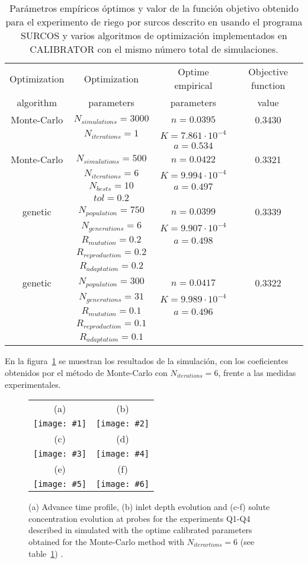 \documentclass[review,authoryear]{elsarticle}
\newcommand{\TABLE}[5]
{
	\begin{table}[ht!]
		\centering
		\caption{#4.\label{#5}}
		#1
		\begin{tabular}{#2}
			#3
		\end{tabular}
	\end{table}
}
\newcommand{\FIGVI}[8]
{
	\begin{figure}[ht!]
		\centering
		\begin{tabular}{cc}
			(a) & (b)
			\\ \texttt{[image: \#1]} & \texttt{[image: \#2]}
			\\ (c) & (d)
			\\ \texttt{[image: \#3]} & \texttt{[image: \#4]}
			\\ (e) & (f)
			\\ \texttt{[image: \#5]} & \texttt{[image: \#6]}
		\end{tabular}
		\caption{#7.\label{#8}}
	\end{figure}
}
\begin{document}
\TABLE{\scriptsize}{cccc}
{
	Optimization & Optimization & Optime empirical & Objective function
	\\ algorithm & parameters & parameters & value
	\\ \hline
	Monte-Carlo & $N_{simulations}=3000$ & $n=0.0395$ & 0.3430
	\\ & $N_{iterations}=1$ & $K=7.861\cdot 10^{-4}$
	\\ & & $a=0.534$
	\\ \hline
	Monte-Carlo & $N_{simulations}=500$ & $n=0.0422$ & 0.3321
	\\ & $N_{iterations}=6$ & $K=9.994\cdot 10^{-4}$
	\\ & $N_{bests}=10$ & $a=0.497$
	\\ & $tol=0.2$
	\\ \hline
	genetic & $N_{population}=750$ & $n=0.0399$ & 0.3339
	\\ & $N_{generations}=6$ & $K=9.907\cdot 10^{-4}$
	\\ & $R_{mutation}=0.2$ & $a=0.498$
	\\ & $R_{reproduction}=0.2$
	\\ & $R_{adaptation}=0.2$
	\\ \hline
	genetic & $N_{population}=300$ & $n=0.0417$ & 0.3322
	\\ & $N_{generations}=31$ & $K=9.989\cdot 10^{-4}$
	\\ & $R_{mutation}=0.1$ & $a=0.496$
	\\ & $R_{reproduction}=0.1$
	\\ & $R_{adaptation}=0.1$
	\\ \hline
}{Parámetros empíricos óptimos y valor de la función objetivo obtenido para el
experimento de riego por surcos descrito en \citet{JaviSurcos2} usando el
programa SURCOS y varios algoritmos de optimización implementados en CALIBRATOR
con el mismo número total de simulaciones}{TabSurcos}

En la figura~\ref{FigSurcos} se muestran los resultados de la simulación, con
los coeficientes obtenidos por el método de Monte-Carlo con $N_{iterations}=6$,
frente a las medidas experimentales.

\FIGVI{surcos-advance.eps}{surcos-depth.eps}{surcos-solute-q1.eps}
{surcos-solute-q2.eps}{surcos-solute-q3.eps}{surcos-solute-q4.eps}
{
	(a) Advance time profile, (b) inlet depth evolution and (c-f) solute
	concentration evolution at probes for the experiments Q1-Q4 described in
	\citet{JaviSurcos2} simulated with the optime calibrated parameters obtained
	for the Monte-Carlo method with $N_{iterartions}=6$ (see
	table~\ref{TabSurcos})
}{FigSurcos}
\end{document}
